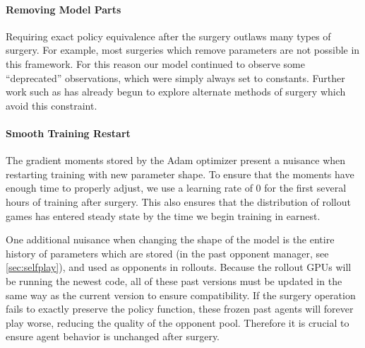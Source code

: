 \documentclass[ocean-paper.tex]{subfiles}
\begin{document}
\paragraph{Removing Model Parts}
Requiring exact policy equivalence after the surgery outlaws many types of surgery. 
For example, most surgeries which remove parameters are not possible in this framework. 
For this reason our model continued to observe some ``deprecated'' observations, which were simply always set to constants.
Further work such as \cite{unpublishedrobotics} has already begun to explore alternate methods of surgery which avoid this constraint.

\paragraph{Smooth Training Restart}
The gradient moments stored by the Adam optimizer present a nuisance when restarting training with new parameter shape. 
To ensure that the moments have enough time to properly adjust, we use a learning rate of 0 for the first several hours of training after surgery. 
This also ensures that the distribution of rollout games has entered steady state by the time we begin training in earnest.

One additional nuisance when changing the shape of the model is the entire history of parameters which are stored (in the past opponent manager, see \autoref{sec:selfplay}), and used as opponents in rollouts. 
Because the rollout GPUs will be running the newest code, all of these past versions must be updated in the same way as the current version to ensure compatibility. 
If the surgery operation fails to exactly preserve the policy function, these frozen past agents will forever play worse, reducing the quality of the opponent pool.
Therefore it is crucial to ensure agent behavior is unchanged after surgery. 


\end{document}
